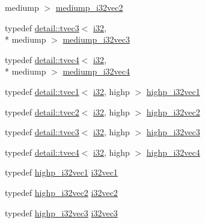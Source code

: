 \begin{DoxyCompactItemize}
mediump $>$ \hyperlink{group__gtc__type__precision_gaef7b37956ce9e1cc4faecf21b7fdae8b}{mediump\-\_\-i32vec2}
\item 
typedef \hyperlink{structglm_1_1detail_1_1tvec3}{detail\-::tvec3}$<$ \hyperlink{group__gtc__type__precision_ga1d8ed5c43e91ea7d4528389da4fa9524}{i32}, \\*
mediump $>$ \hyperlink{group__gtc__type__precision_ga768e62b66086bd85a438341eedfad651}{mediump\-\_\-i32vec3}
\item 
typedef \hyperlink{structglm_1_1detail_1_1tvec4}{detail\-::tvec4}$<$ \hyperlink{group__gtc__type__precision_ga1d8ed5c43e91ea7d4528389da4fa9524}{i32}, \\*
mediump $>$ \hyperlink{group__gtc__type__precision_ga68126328090f37655d8218c5a5fb8ae5}{mediump\-\_\-i32vec4}
\item 
typedef \hyperlink{structglm_1_1detail_1_1tvec1}{detail\-::tvec1}$<$ \hyperlink{group__gtc__type__precision_ga1d8ed5c43e91ea7d4528389da4fa9524}{i32}, highp $>$ \hyperlink{group__gtc__type__precision_gadcd58130a48fa561e784a135a88c5d6e}{highp\-\_\-i32vec1}
\item 
typedef \hyperlink{structglm_1_1detail_1_1tvec2}{detail\-::tvec2}$<$ \hyperlink{group__gtc__type__precision_ga1d8ed5c43e91ea7d4528389da4fa9524}{i32}, highp $>$ \hyperlink{group__gtc__type__precision_ga6020d795076243085eb0d6826c849b4a}{highp\-\_\-i32vec2}
\item 
typedef \hyperlink{structglm_1_1detail_1_1tvec3}{detail\-::tvec3}$<$ \hyperlink{group__gtc__type__precision_ga1d8ed5c43e91ea7d4528389da4fa9524}{i32}, highp $>$ \hyperlink{group__gtc__type__precision_ga95de80f73e676fb6b9976ff0d33bbc4b}{highp\-\_\-i32vec3}
\item 
typedef \hyperlink{structglm_1_1detail_1_1tvec4}{detail\-::tvec4}$<$ \hyperlink{group__gtc__type__precision_ga1d8ed5c43e91ea7d4528389da4fa9524}{i32}, highp $>$ \hyperlink{group__gtc__type__precision_ga174af0fafdc5a9eb24150792bffa8b5c}{highp\-\_\-i32vec4}
\item 
typedef \hyperlink{group__gtc__type__precision_gadcd58130a48fa561e784a135a88c5d6e}{highp\-\_\-i32vec1} \hyperlink{group__gtc__type__precision_ga0d3741d44591183f3dee9500b4ad9ab4}{i32vec1}
\item 
typedef \hyperlink{group__gtc__type__precision_ga6020d795076243085eb0d6826c849b4a}{highp\-\_\-i32vec2} \hyperlink{group__gtc__type__precision_gabb9ac4a278f8a8e3a3928dc9bef81089}{i32vec2}
\item 
typedef \hyperlink{group__gtc__type__precision_ga95de80f73e676fb6b9976ff0d33bbc4b}{highp\-\_\-i32vec3} \hyperlink{group__gtc__type__precision_ga79a21b299190b6fee673087376753db0}{i32vec3}

\end{DoxyCompactItemize}
